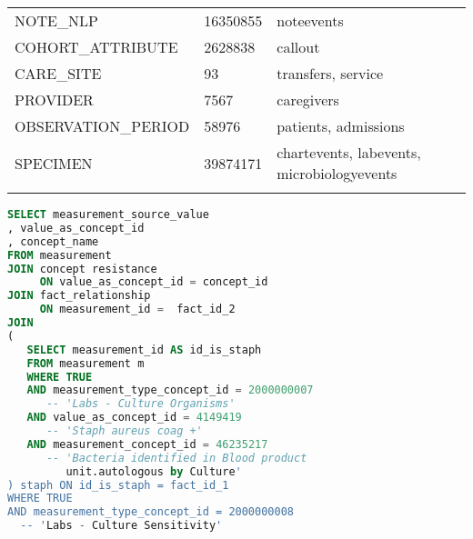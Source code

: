 \begin{table*}[t]
\begin{tabular}{@{}lll@{}}
NOTE\_NLP             & 16350855       & noteevents                                               \\
COHORT\_ATTRIBUTE     & 2628838        & callout                                                  \\
CARE\_SITE            & 93             & transfers, service                                       \\
PROVIDER              & 7567           & caregivers                                               \\
OBSERVATION\_PERIOD   & 58976          & patients, admissions                                     \\
SPECIMEN              & 39874171       & chartevents, labevents, microbiologyevents               \\\botrule
\end{tabular}
\label{table:dispatch}
\end{table*}
 

\begin{lstlisting}[language=sql,basicstyle=\scriptsize,caption=Original table microbiology SQL query,label={lst:original}]
SELECT measurement_source_value
, value_as_concept_id
, concept_name
FROM measurement
JOIN concept resistance 
     ON value_as_concept_id = concept_id
JOIN fact_relationship 
     ON measurement_id =  fact_id_2
JOIN
(
   SELECT measurement_id AS id_is_staph
   FROM measurement m
   WHERE TRUE 
   AND measurement_type_concept_id = 2000000007        			
      -- 'Labs - Culture Organisms'
   AND value_as_concept_id = 4149419                     			
      -- 'Staph aureus coag +' 
   AND measurement_concept_id = 46235217               			
      -- 'Bacteria identified in Blood product 
         unit.autologous by Culture'
) staph ON id_is_staph = fact_id_1
WHERE TRUE
AND measurement_type_concept_id = 2000000008
  -- 'Labs - Culture Sensitivity'
\end{lstlisting}


